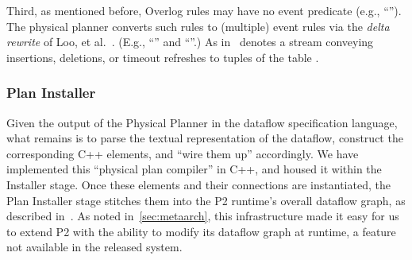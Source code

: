 

Third, as mentioned before, Overlog rules may have no event predicate
(e.g., ``''). 
The physical planner converts such rules to (multiple) event rules via the {\em delta
rewrite} of Loo, et al.~\cite{loo-sigmod06}. (E.g., ``'' and ``''.) As in~\cite{loo-sigmod06}  denotes a stream conveying
insertions, deletions, or timeout refreshes to tuples of the table
.


\subsubsection{Plan Installer}
\label{sec:installer}

Given the output of the Physical Planner in the dataflow specification
language, what remains is to parse the
textual representation of the dataflow,  construct the
corresponding C++ elements, and ``wire them up'' accordingly. We have
implemented this 
``physical plan compiler'' in C++, and housed it within the
Installer stage.  Once these elements and their connections are
instantiated, the Plan Installer stage stitches them into the P2
runtime's overall dataflow graph, as described in~\cite{p2:sosp}.
As noted in~\ref{sec:metaarch}, this infrastructure made it easy for us to extend P2 with the ability to modify its dataflow graph at runtime,
a feature not available in the released system. 
% 

